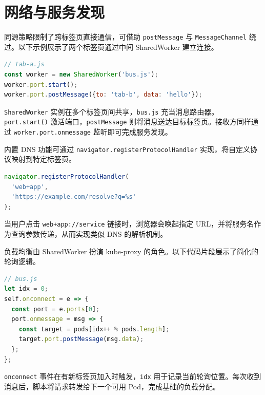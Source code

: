\chapter{网络与服务发现}
同源策略限制了跨标签页直接通信，可借助 \texttt{postMessage} 与 \texttt{MessageChannel} 绕过。以下示例展示了两个标签页通过中间 SharedWorker 建立连接。\par
\begin{lstlisting}[language=js]
// tab-a.js
const worker = new SharedWorker('bus.js');
worker.port.start();
worker.port.postMessage({to: 'tab-b', data: 'hello'});
\end{lstlisting}
\texttt{SharedWorker} 实例在多个标签页间共享，\texttt{bus.js} 充当消息路由器。\texttt{port.start()} 激活端口，\texttt{postMessage} 则将消息送达目标标签页。接收方同样通过 \texttt{worker.port.onmessage} 监听即可完成服务发现。\par
内置 DNS 功能可通过 \texttt{navigator.registerProtocolHandler} 实现，将自定义协议映射到特定标签页。\par
\begin{lstlisting}[language=js]
navigator.registerProtocolHandler(
  'web+app',
  'https://example.com/resolve?q=%s'
);
\end{lstlisting}
当用户点击 \texttt{web+app://service} 链接时，浏览器会唤起指定 URL，并将服务名作为查询参数传递，从而实现类似 DNS 的解析机制。\par
负载均衡由 SharedWorker 扮演 kube-proxy 的角色。以下代码片段展示了简化的轮询逻辑。\par
\begin{lstlisting}[language=js]
// bus.js
let idx = 0;
self.onconnect = e => {
  const port = e.ports[0];
  port.onmessage = msg => {
    const target = pods[idx++ % pods.length];
    target.port.postMessage(msg.data);
  };
};
\end{lstlisting}
\texttt{onconnect} 事件在有新标签页加入时触发，\texttt{idx} 用于记录当前轮询位置。每次收到消息后，脚本将请求转发给下一个可用 Pod，完成基础的负载分配。\par
